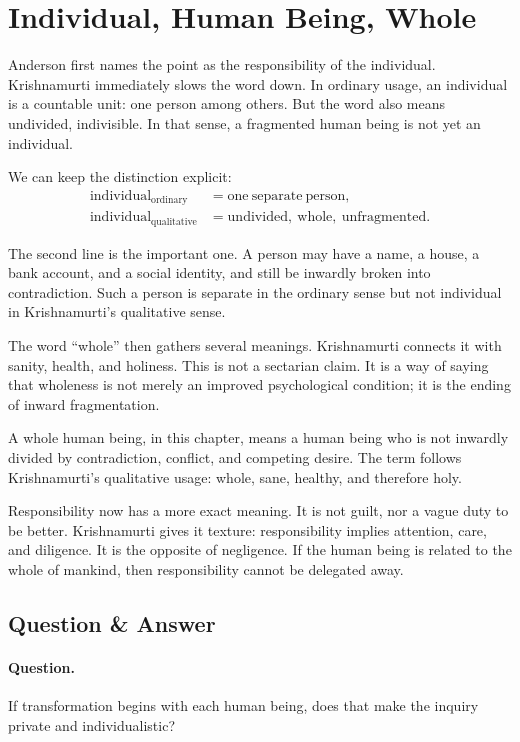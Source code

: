 \section{Individual, Human Being, Whole}

Anderson first names the point as the responsibility of the individual. Krishnamurti immediately slows the word down. In ordinary usage, an individual is a countable unit: one person among others. But the word also means undivided, indivisible. In that sense, a fragmented human being is not yet an individual.

We can keep the distinction explicit:
\begin{align}
\mathrm{individual}_{\mathrm{ordinary}}
&= \mathrm{one\ separate\ person},\\
\mathrm{individual}_{\mathrm{qualitative}}
&= \mathrm{undivided,\ whole,\ unfragmented}.
\end{align}

The second line is the important one. A person may have a name, a house, a bank account, and a social identity, and still be inwardly broken into contradiction. Such a person is separate in the ordinary sense but not individual in Krishnamurti's qualitative sense.

The word ``whole'' then gathers several meanings. Krishnamurti connects it with sanity, health, and holiness. This is not a sectarian claim. It is a way of saying that wholeness is not merely an improved psychological condition; it is the ending of inward fragmentation.

\begin{definition}
A whole human being, in this chapter, means a human being who is not inwardly divided by contradiction, conflict, and competing desire. The term follows Krishnamurti's qualitative usage: whole, sane, healthy, and therefore holy.
\end{definition}

Responsibility now has a more exact meaning. It is not guilt, nor a vague duty to be better. Krishnamurti gives it texture: responsibility implies attention, care, and diligence. It is the opposite of negligence. If the human being is related to the whole of mankind, then responsibility cannot be delegated away.

\subsection{Question \& Answer}

\paragraph{Question.}
If transformation begins with each human being, does that make the inquiry private and individualistic?


